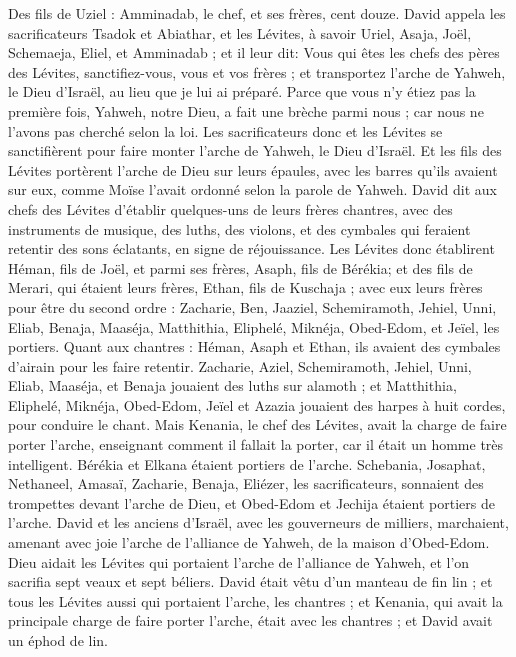 \begin{multicols}{2}
Des fils de Uziel : Amminadab, le chef, et ses frères, cent douze.
David appela les sacrificateurs Tsadok et Abiathar, et les Lévites, à savoir Uriel, Asaja, Joël, Schemaeja, Eliel, et Amminadab ;
et il leur dit: Vous qui êtes les chefs des pères des Lévites, sanctifiez-vous, vous et vos frères ; et transportez l'arche de Yahweh, le Dieu d'Israël, au lieu que je lui ai préparé.
Parce que vous n'y étiez pas la première fois, Yahweh, notre Dieu, a fait une brèche parmi nous ; car nous ne l'avons pas cherché selon la loi.
Les sacrificateurs donc et les Lévites se sanctifièrent pour faire monter l'arche de Yahweh, le Dieu d'Israël.
Et les fils des Lévites portèrent l'arche de Dieu sur leurs épaules, avec les barres qu'ils avaient sur eux, comme Moïse l'avait ordonné selon la parole de Yahweh.
David dit aux chefs des Lévites d'établir quelques-uns de leurs frères chantres, avec des instruments de musique, des luths, des violons, et des cymbales qui feraient retentir des sons éclatants, en signe de réjouissance.
Les Lévites donc établirent Héman, fils de Joël, et parmi ses frères, Asaph, fils de Bérékia; et des fils de Merari, qui étaient leurs frères, Ethan, fils de Kuschaja ;
avec eux leurs frères pour être du second ordre : Zacharie, Ben, Jaaziel, Schemiramoth, Jehiel, Unni, Eliab, Benaja, Maaséja, Matthithia, Eliphelé, Miknéja, Obed-Edom, et Jeïel, les portiers.
Quant aux chantres : Héman, Asaph et Ethan, ils avaient des cymbales d'airain pour les faire retentir.
Zacharie, Aziel, Schemiramoth, Jehiel, Unni, Eliab, Maaséja, et Benaja jouaient des luths sur alamoth ;
et Matthithia, Eliphelé, Miknéja, Obed-Edom, Jeïel et Azazia jouaient des harpes à huit cordes, pour conduire le chant.
Mais Kenania, le chef des Lévites, avait la charge de faire porter l'arche, enseignant comment il fallait la porter, car il était un homme très intelligent.
Bérékia et Elkana étaient portiers de l'arche.
Schebania, Josaphat, Nethaneel, Amasaï, Zacharie, Benaja, Eliézer, les sacrificateurs, sonnaient des trompettes devant l'arche de Dieu, et Obed-Edom et Jechija étaient portiers de l'arche.
David et les anciens d'Israël, avec les gouverneurs de milliers, marchaient, amenant avec joie l'arche de l'alliance de Yahweh, de la maison d'Obed-Edom.
Dieu aidait les Lévites qui portaient l'arche de l'alliance de Yahweh, et l'on sacrifia sept veaux et sept béliers.
David était vêtu d'un manteau de fin lin ; et tous les Lévites aussi qui portaient l'arche, les chantres ; et Kenania, qui avait la principale charge de faire porter l'arche, était avec les chantres ; et David avait un éphod de lin.

\end{multicols}
